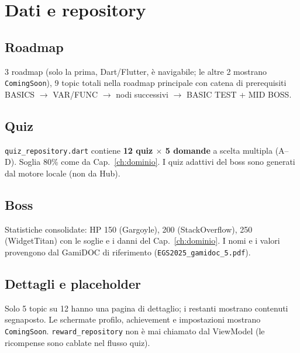 \chapter{Dati e repository}
\label{ch:dati}

\section{Roadmap}
3 roadmap (solo la prima, Dart/Flutter, è navigabile; le altre 2 mostrano
\texttt{ComingSoon}), 9 topic totali nella roadmap principale con catena di
prerequisiti BASICS $\rightarrow$ VAR/FUNC $\rightarrow$ nodi successivi
$\rightarrow$ BASIC TEST + MID BOSS.

\section{Quiz}
\texttt{quiz\_repository.dart} contiene \textbf{12 quiz $\times$ 5 domande}
a scelta multipla (A--D). Soglia 80\% come da Cap.~\ref{ch:dominio}.
I quiz adattivi del boss sono generati dal motore locale (non da Hub).

\section{Boss}
Statistiche consolidate: HP 150 (Gargoyle), 200 (StackOverflow), 250
(WidgetTitan) con le soglie e i danni del Cap.~\ref{ch:dominio}.
I nomi e i valori provengono dal GamiDOC di riferimento
(\texttt{EGS2025\_gamidoc\_5.pdf}).

\section{Dettagli e placeholder}
Solo 5 topic su 12 hanno una pagina di dettaglio; i restanti mostrano
contenuti segnaposto. Le schermate profilo, achievement e impostazioni
mostrano \texttt{ComingSoon}. \texttt{reward\_repository} non è mai
chiamato dal ViewModel (le ricompense sono cablate nel flusso quiz).
